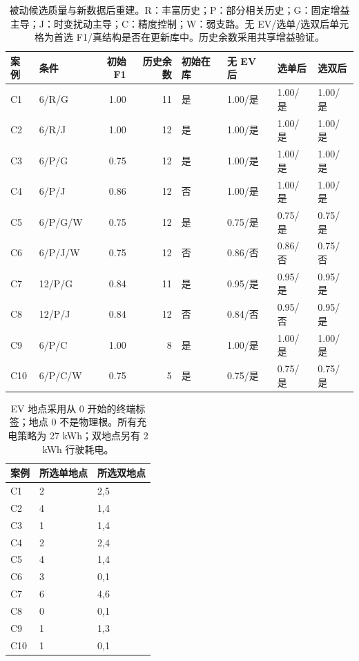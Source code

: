 \begin{table}[htbp]\centering\small
\begin{tabular}{llrrllll}\toprule
案例 & 条件 & 初始 F1 & 历史余数 & 初始在库 & 无 EV 后 & 选单后 & 选双后\\\midrule
C1 & 6/R/G & 1.00 & 11 & 是 & 1.00/是 & 1.00/是 & 1.00/是\\
C2 & 6/R/J & 1.00 & 12 & 是 & 1.00/是 & 1.00/是 & 1.00/是\\
C3 & 6/P/G & 0.75 & 12 & 是 & 1.00/是 & 1.00/是 & 1.00/是\\
C4 & 6/P/J & 0.86 & 12 & 否 & 1.00/是 & 1.00/是 & 1.00/是\\
C5 & 6/P/G/W & 0.75 & 12 & 是 & 0.75/是 & 0.75/是 & 0.75/是\\
C6 & 6/P/J/W & 0.75 & 12 & 否 & 0.86/否 & 0.86/否 & 0.75/否\\
C7 & 12/P/G & 0.84 & 11 & 是 & 0.95/是 & 0.95/是 & 0.95/是\\
C8 & 12/P/J & 0.84 & 12 & 否 & 0.84/否 & 0.95/否 & 0.95/是\\
C9 & 6/P/C & 1.00 & 8 & 是 & 1.00/是 & 1.00/是 & 1.00/是\\
C10 & 6/P/C/W & 0.75 & 5 & 是 & 0.75/是 & 0.75/是 & 0.75/是\\
\bottomrule\end{tabular}
\caption{被动候选质量与新数据后重建。R：丰富历史；P：部分相关历史；G：固定增益主导；J：时变扰动主导；C：精度控制；W：弱支路。无 EV/选单/选双后单元格为首选 F1/真结构是否在更新库中。历史余数采用共享增益验证。}
\end{table}
\begin{table}[htbp]\centering\small
\begin{tabular}{lll}\toprule 案例 & 所选单地点 & 所选双地点\\\midrule
C1 & 2 & 2,5\\
C2 & 4 & 1,4\\
C3 & 1 & 1,4\\
C4 & 2 & 2,4\\
C5 & 4 & 1,4\\
C6 & 3 & 0,1\\
C7 & 6 & 4,6\\
C8 & 0 & 0,1\\
C9 & 1 & 1,3\\
C10 & 1 & 0,1\\
\bottomrule\end{tabular}
\caption{EV 地点采用从 0 开始的终端标签；地点 0 不是物理根。所有充电策略为 27 kWh；双地点另有 2 kWh 行驶耗电。}
\end{table}
